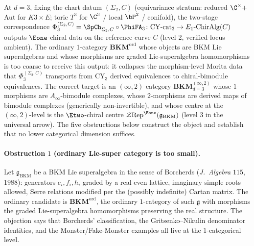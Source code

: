 At $d=3$, fixing the chart datum $(\Sigma_2, C)$ (equivariance
stratum: reduced $\C^\times +$ Aut for $K3 \times E$; toric $T^3$ for
$\C^3$ / local $\bP^2$ / conifold), the two-stage correspondence
$\Phi_3^{(\Sigma_2, C)}=\SpCh_{\Sigma_2, C}\circ\PhiFA_3
\colon\mathrm{CY}\text{-}\mathrm{cat}_3\to E_1\text{-}\mathrm{ChirAlg}(C)$
outputs $\Eone$-chiral data on the reference curve $C$ (level $2$,
verified-locus ambient). The ordinary $1$-category
$\mathbf{BKM}^{\mathrm{ord}}$ whose objects are BKM Lie
superalgebras and whose morphisms are graded Lie-superalgebra
homomorphisms is too coarse to receive this output: it collapses
the morphism-level Morita data that
$\Phi_3^{(\Sigma_2, C)}$ transports from CY$_3$
derived equivalences to chiral-bimodule equivalences. The correct
target is an $(\infty,2)$-category $\mathbf{BKM}^{(\infty,2)}_{d=3}$
whose $1$-morphisms are $A_\infty$-bimodule complexes, whose
$2$-morphisms are derived maps of bimodule complexes (generically
non-invertible), and whose centre at the $(\infty,2)$-level is the
$\Etwo$-chiral centre
$\mathcal Z\mathrm{Rep}^{\Eone}(\mathfrak g_{\mathrm{BKM}})$
(level $3$ in the universal arrow). The
five obstructions below construct the object and establish that no lower
categorical dimension suffices.

\paragraph{Obstruction \texorpdfstring{$1$}{1} (ordinary Lie-super category is too small).}
Let $\mathfrak g_{\mathrm{BKM}}$ be a BKM Lie superalgebra in the
sense of Borcherds (\emph{J.\ Algebra} $115$, $1988$): generators
$e_i,f_i,h_i$ graded by a real even lattice, imaginary simple roots
allowed, Serre relations modified per the (possibly indefinite)
Cartan matrix. The ordinary candidate is $\mathbf{BKM}^{\mathrm{ord}}$,
the ordinary $1$-category of such $\mathfrak g$ with morphisms the
graded Lie-superalgebra homomorphisms preserving the real structure.
The objection says that Borcherds' classification, the
Gritsenko--Nikulin denominator identities, and the
Monster/Fake-Monster examples all live at the $1$-categorical
level.

